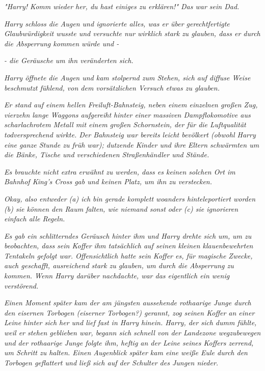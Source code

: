 {\emph{"\emph{Harry! Komm wieder her, du hast einiges zu erklären!}" Das war sein Dad.}

\emph{Harry schloss die Augen und ignorierte alles, was er über gerechtfertigte Glaubwürdigkeit wusste und versuchte nur} \emph{\emph{wirklich stark}} \emph{zu glauben, dass er durch die Absperrung kommen würde und -}

\emph{- die Geräusche um ihn veränderten sich.}

\emph{Harry öffnete die Augen und kam stolpernd zum Stehen, sich auf diffuse Weise beschmutzt fühlend, von dem vorsätzlichen Versuch etwas zu glauben.}

\emph{Er stand auf einem hellen Freiluft-Bahnsteig, neben einem einzelnen großen Zug, vierzehn lange Waggons aufgereiht hinter einer massiven Dampflokomotive aus scharlachrotem Metall mit einem großen Schornstein, der für die Luftqualität todversprechend wirkte. Der Bahnsteig war bereits leicht bevölkert (obwohl Harry eine ganze Stunde zu früh war); dutzende Kinder und ihre Eltern schwärmten um die Bänke, Tische und verschiedenen Straßenhändler und Stände.}

\emph{Es brauchte nicht extra erwähnt zu werden, dass es keinen solchen Ort im Bahnhof King's Cross gab und keinen Platz, um ihn zu verstecken.}

\emph{\emph{Okay, also entweder (a) ich bin gerade komplett woanders hinteleportiert worden (b) sie können den Raum falten, wie niemand sonst oder (c) sie ignorieren einfach alle Regeln.}}

\emph{Es gab ein schlitterndes Geräusch hinter ihm und Harry drehte sich um,} \emph{um zu beobachten, dass sein Koffer ihm tatsächlich auf seinen kleinen klauenbewehrten Tentakeln gefolgt war. Offensichtlich hatte sein Koffer es, für magische Zwecke, auch geschafft, ausreichend stark zu glauben, um durch die Absperrung zu kommen. Wenn Harry darüber nachdachte, war das eigentlich ein wenig verstörend.}

\emph{Einen Moment später kam der am jüngsten aussehende rothaarige Junge durch den eisernen Torbogen (eiserner Torbogen?) gerannt, zog seinen Koffer an einer Leine hinter sich her und lief fast in Harry hinein. Harry, der sich dumm fühlte, weil er stehen geblieben war, begann sich schnell von der Landezone wegzubewegen und der rothaarige Junge folgte ihm, heftig an der Leine seines Koffers zerrend, um Schritt zu halten. Einen Augenblick später kam eine weiße Eule durch den Torbogen geflattert und ließ sich auf der Schulter des Jungen nieder.}

}
